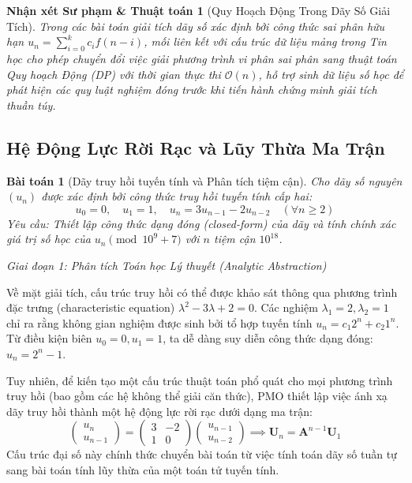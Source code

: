\documentclass{article}
\newtheorem{baitoan}{Bài toán}
\newtheorem{nhanxet}{Nhận xét Sư phạm \& Thuật toán}
\begin{document}
\begin{nhanxet}[Quy Hoạch Động Trong Dãy Số Giải Tích]
Trong các bài toán giải tích dãy số xác định bởi công thức sai phân hữu hạn $u_n = \sum_{i=0}^k c_i f(n-i)$, mối liên kết với cấu trúc dữ liệu mảng trong Tin học cho phép chuyển đổi việc giải phương trình vi phân sai phân sang thuật toán Quy hoạch Động (DP) với thời gian thực thi $\mathcal{O}(n)$, hỗ trợ sinh dữ liệu số học để phát hiện các quy luật nghiệm đóng trước khi tiến hành chứng minh giải tích thuần túy.
\end{nhanxet}

\subsection{Hệ Động Lực Rời Rạc và Lũy Thừa Ma Trận}

\begin{baitoan}[Dãy truy hồi tuyến tính và Phân tích tiệm cận]
Cho dãy số nguyên $(u_n)$ được xác định bởi công thức truy hồi tuyến tính cấp hai:
\begin{equation*}
 u_0 = 0,\quad u_1 = 1,\quad u_n = 3u_{n-1} - 2u_{n-2} \quad (\forall n \ge 2)
\end{equation*}
Yêu cầu: Thiết lập công thức dạng đóng (closed-form) của dãy và tính chính xác giá trị số học của $u_n \pmod{10^9+7}$ với $n$ tiệm cận $10^{18}$.
\end{baitoan}

\vspace{0.5em}\noindent\emph{Giai đoạn 1: Phân tích Toán học Lý thuyết (Analytic Abstraction)}

Về mặt giải tích, cấu trúc truy hồi có thể được khảo sát thông qua phương trình đặc trưng (characteristic equation) $\lambda^2 - 3\lambda + 2 = 0$.
 Các nghiệm $\lambda_1 = 2, \lambda_2 = 1$ chỉ ra rằng không gian nghiệm được sinh bởi tổ hợp tuyến tính $u_n = c_1 2^n + c_2 1^n$. Từ điều kiện biên $u_0 = 0, u_1 = 1$, ta dễ dàng suy diễn công thức dạng đóng: $u_n = 2^n - 1$. 

Tuy nhiên, để kiến tạo một cấu trúc thuật toán phổ quát cho mọi phương trình truy hồi (bao gồm các hệ không thể giải căn thức), PMO thiết lập việc ánh xạ dãy truy hồi thành một hệ động lực rời rạc dưới dạng ma trận:
\begin{equation*}
 \begin{pmatrix} u_n \\ u_{n-1} \end{pmatrix} = \begin{pmatrix} 3 & -2 \\ 1 & 0 \end{pmatrix} \begin{pmatrix} u_{n-1} \\ u_{n-2} \end{pmatrix} \implies \mathbf{U}_n = \mathbf{A}^{n-1} \mathbf{U}_1
\end{equation*}
Cấu trúc đại số này chính thức chuyển bài toán từ việc tính toán dãy số tuần tự sang bài toán tính lũy thừa của một toán tử tuyến tính.
\end{document}
